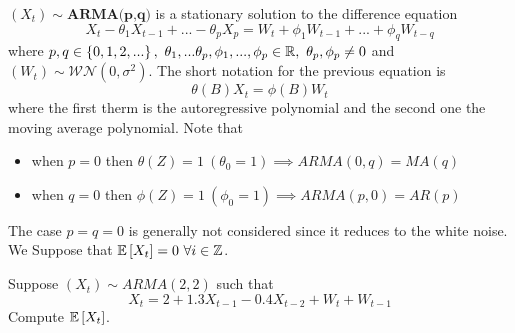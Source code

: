 \begin{definition}
    $(X_t)\sim \textbf{ARMA(p,q)}$ is a stationary solution to the difference equation
    \[
        X_t-\theta_1X_{t-1}+...-\theta_pX_p=W_t+\phi_1W_{t-1}+...+\phi_qW_{t-q}  
    \]
    where $p,q\in\set{0,1,2,...},\ \theta_1,...\theta_p,\phi_1,...,\phi_p\in\R,\ \theta_p,\phi_p\ne0$ and $(W_t)\sim\mathcal{WN}(0,\sigma^2)$. The short notation for the previous equation is
    \[
          \theta(B)X_t=\phi(B)W_t
    \]
    where the first therm is the autoregressive polynomial and the second one the moving average polynomial. Note that
    \begin{itemize}
        \item when $p=0$ then $\theta(Z)=1\ (\theta_0=1)\implies ARMA(0,q)=MA(q)$
        \item when $q=0$ then $\phi(Z)=1\ (\phi_0=1)\implies ARMA(p,0)=AR(p)$
    \end{itemize}
    The case $p=q=0$ is generally not considered since it reduces to the white noise. We Suppose that $\mathbb{E}\left[X_t\right]=0\ \forall i\in\mathbb{Z}$.
\end{definition}

\begin{exercise}
    Suppose $(X_t)\sim ARMA(2,2)$ such that
    \[
        X_t=2+1.3X_{t-1}-0.4X_{t-2}+W_t+W_{t-1}  
    \]
    Compute $\mathbb{E}\left[X_t\right]$.
\end{exercise}